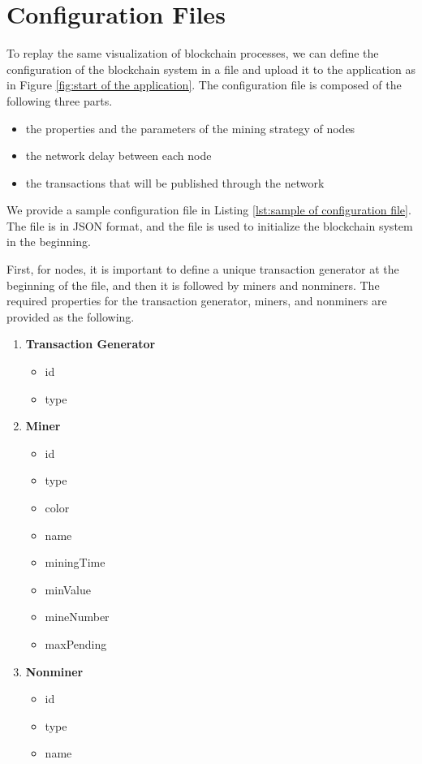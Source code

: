 \section{Configuration Files}

To replay the same visualization of blockchain processes, we can define the configuration of the blockchain system in a file and upload it to the application as in Figure \ref{fig:start of the application}. The configuration file is composed of the following three parts.

\begin{itemize}
    \item the properties and the parameters of the mining strategy of nodes
    \item the network delay between each node
    \item the transactions that will be published through the network
\end{itemize}

We provide a sample configuration file in Listing \ref{lst:sample of configuration file}. The file is in JSON format, and the file is used to initialize the blockchain system in the beginning.

First, for nodes, it is important to define a unique transaction generator at the beginning of the file, and then it is followed by miners and nonminers. The required properties for the transaction generator, miners, and nonminers are provided as the following.

\clearpage

\begin{enumerate}
    \item \textbf{Transaction Generator}
        \begin{itemize}
            \item id
            \item type
        \end{itemize}
    \item \textbf{Miner}
        \begin{itemize}
            \item id
            \item type
            \item color
            \item name
            \item miningTime
            \item minValue
            \item mineNumber
            \item maxPending
        \end{itemize}
    \item \textbf{Nonminer}
        \begin{itemize}
            \item id
            \item type
            \item name
        \end{itemize}
\end{enumerate}

